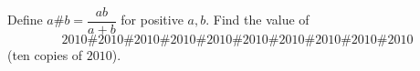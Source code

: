 Define $a\#b=\dfrac{ab}{a+b}$ for positive $a,b$. Find the value of
\[
2010\#2010\#2010\#2010\#2010\#2010\#2010\#2010\#2010\#2010
\]
(ten copies of $2010$).
